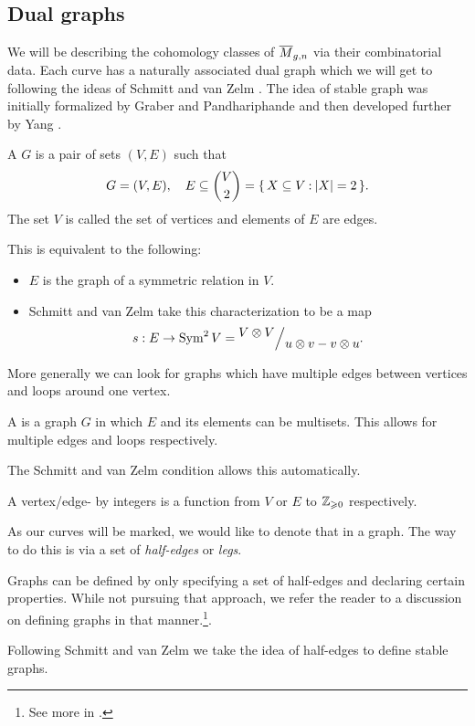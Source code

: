 \documentclass[12pt]{memoir}
\begin{document}
\subsection{Dual graphs}

We will be describing the cohomology classes of $\overline M_{g,n}$ via their combinatorial data. Each curve has a naturally associated dual graph which we will get to following the ideas of Schmitt and van Zelm \cite{SchmittVanZelm}. The idea of stable graph was initially formalized by Graber and Pandhariphande \cite{GraberPandharipande} and then developed further by Yang \cite{YangIntersections}.\par

\begin{Def}
    A  $G$ is a pair of sets $(V,E)$ such that  
    $$G=(V,E),\quad E\subseteq\binom{V}{2}=\{\,X\subseteq V\mathbin{:}\lvert X\rvert=2\,\}.$$
    The set $V$ is called the set of vertices and elements of $E$ are edges.
\end{Def}
This is equivalent to the following:
\begin{itemize}
    \item $E$ is the graph of a symmetric relation in $V$.
    \item  Schmitt and van Zelm take this characterization to be a map 
$$s:E\to\Sym^2 V=\quot{V\ox V}{u\ox v-v\ox u}.$$
\end{itemize} 

More generally we can look for graphs which have multiple edges between vertices and loops around one vertex.

\begin{Def}
A  is a graph $G$ in which $E$ and its elements can be multisets. This allows for multiple edges and loops respectively.    
\end{Def}

The Schmitt and van Zelm condition allows this automatically.

\begin{Def}
    A vertex/edge- by integers is a function from $V$ or $E$ to $\mathbb{Z}_{\geqslant 0}$ respectively. 
\end{Def}

As our curves will be marked, we would like to denote that in a graph. The way to do this is via a set of \emph{half-edges} or \emph{legs}. 
\begin{Rmk}
    Graphs can be defined by only specifying a set of half-edges and declaring certain properties. While not pursuing that approach, we refer the reader to a discussion on defining graphs in that manner.\footnote{See more in \href{https://math.stackexchange.com/q/2678435}{}.}. 
\end{Rmk}
Following Schmitt and van Zelm we take the idea of half-edges to define stable graphs.
\end{document}
